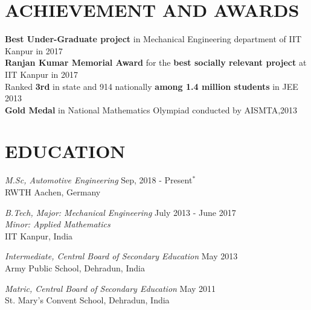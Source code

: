 \documentclass[margin, 10pt]{res} %
\begin{document}
\begin{resume}

\section{ACHIEVEMENT AND AWARDS} 


\textbf{Best Under-Graduate project} in Mechanical Engineering department of IIT Kanpur in 2017 \\
\textbf{Ranjan Kumar Memorial Award} for the \textbf{best socially relevant project} at IIT Kanpur in 2017\\
Ranked \textbf{3rd} in state and 914 nationally \textbf{among 1.4 million students} in JEE 2013\\
\textbf{Gold Medal} in National Mathematics Olympiad conducted by AISMTA,2013\\



\section{EDUCATION}

{\sl M.Sc, Automotive Engineering }%
\hfill Sep, 2018 - Present$^\ast$ \\ 
RWTH Aachen, Germany

{\sl B.Tech, Major: Mechanical Engineering }%
  \hfill July 2013 - June 2017 \\ 
\phantom{x}\hspace{6.5ex} {\sl   Minor: Applied Mathematics}\\IIT Kanpur, India

 

 {\sl Intermediate, Central Board of Secondary Education} \hfill %
 \hfill May 2013 \\
Army Public School, Dehradun, India


{\sl Matric, Central Board of Secondary Education} %
\hfill May 2011 \\
St. Mary's Convent School, Dehradun, India
 


\end{resume}
\end{document}

